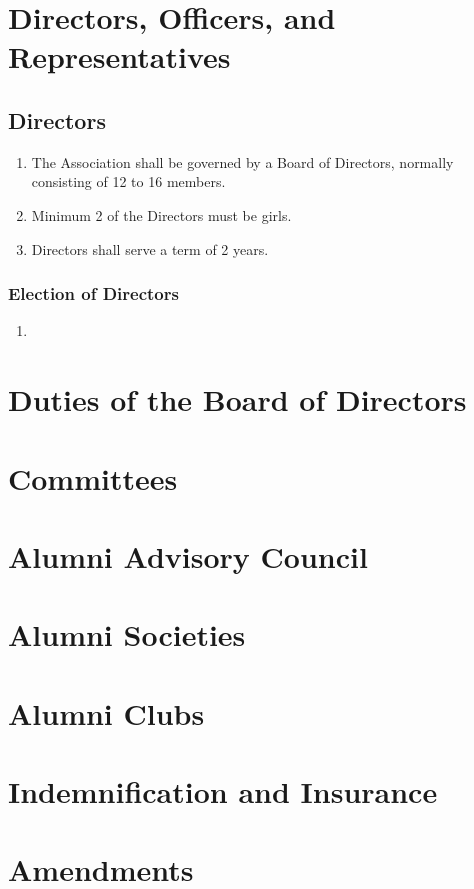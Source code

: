 \documentclass[a4paper,11pt]{book}
\begin{document}
\chapter{Directors, Officers, and Representatives}
\section{Directors}
\begin{enumerate}
\item The Association shall be governed by a Board of Directors, normally 
consisting of 12 to 16 members.
\item Minimum 2 of the Directors must be girls.
\item Directors shall serve a term of 2 years.
\end{enumerate}
\subsection{Election of Directors}
\begin{enumerate}
\item 
\end{enumerate}
\chapter{Duties of the Board of Directors}
\chapter{Committees}

\chapter{Alumni Advisory Council}
\chapter{ Alumni Societies }
\chapter{ Alumni Clubs }
\chapter{ Indemnification and Insurance}
\chapter{ Amendments }
\end{document}
